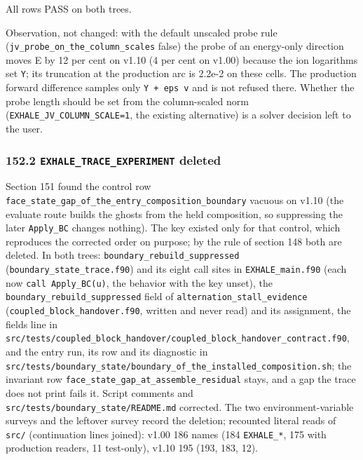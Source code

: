 \documentclass[english,a4paper]{my_memo}
\begin{document}
All rows PASS on both trees.

Observation, not changed: with the default unscaled probe rule (\texttt{jv\_probe\_on\_the\_column\_scales} false) the probe of an energy-only direction moves E by 12 per cent on v1.10 (4 per cent on v1.00) because the ion logarithms set \texttt{\textbar{}\textbar{}Y\textbar{}\textbar{}}; its truncation at the production arc is 2.2e-2 on these cells. The production forward difference samples only \texttt{Y\ +\ eps\ v} and is not refused there. Whether the probe length should be set from the column-scaled norm (\texttt{EXHALE\_JV\_COLUMN\_SCALE=1}, the existing alternative) is a solver decision left to the user.

\subsubsection{\texorpdfstring{152.2 \texttt{EXHALE\_TRACE\_EXPERIMENT} deleted}{152.2 EXHALE\_TRACE\_EXPERIMENT deleted}}\label{1522-exhale_trace_experiment-deleted}

Section 151 found the control row \texttt{face\_state\_gap\_of\_the\_entry\_composition\_boundary} vacuous on v1.10 (the evaluate route builds the ghosts from the held composition, so suppressing the later \texttt{Apply\_BC} changes nothing). The key existed only for that control, which reproduces the corrected order on purpose; by the rule of section 148 both are deleted. In both trees: \texttt{boundary\_rebuild\_suppressed} (\texttt{boundary\_state\_trace.f90}) and its eight call sites in \texttt{EXHALE\_main.f90} (each now \texttt{call\ Apply\_BC(u)}, the behavior with the key unset), the \texttt{boundary\_rebuild\_suppressed} field of \texttt{alternation\_stall\_evidence} (\texttt{coupled\_block\_handover.f90}, written and never read) and its assignment, the field\textquotesingle s line in \texttt{src/tests/coupled\_block\_handover/coupled\_block\_handover\_contract.f90}, and the entry run, its row and its diagnostic in \texttt{src/tests/boundary\_state/boundary\_of\_the\_installed\_composition.sh}; the invariant row \texttt{face\_state\_gap\_at\_assemble\_residual} stays, and a gap the trace does not print fails it. Script comments and \texttt{src/tests/boundary\_state/README.md} corrected. The two environment-variable surveys and the leftover survey record the deletion; recounted literal reads of \texttt{src/} (continuation lines joined): v1.00 186 names (184 \texttt{EXHALE\_*}, 175 with production readers, 11 test-only), v1.10 195 (193, 183, 12).
\end{document}
